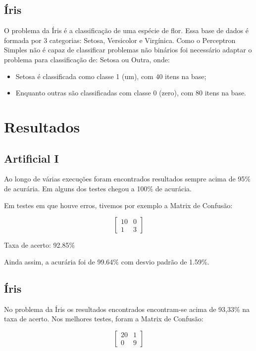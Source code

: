 \subsection{Íris}

O problema da Íris é a classificação de uma espécie de flor. Essa base
de dados é formada por 3 categorias: Setosa, Versicolor e Virgínica.
Como o Perceptron Simples não é capaz de classificar problemas não
binários foi necessário adaptar o problema para classificação de: Setosa
ou Outra, onde:

\begin{itemize}
\tightlist
\item
  Setosa é classificada como classe 1 (um), com 40 itens na base;
\item
  Enquanto outras são classificadas com classe 0 (zero), com 80 itens na
  base.
\end{itemize}

\section{Resultados}

\subsection{Artificial I}

Ao longo de várias execuções foram encontrados resultados sempre acima
de 95\% de acurária. Em alguns dos testes chegou a 100\% de acurácia.

Em testes em que houve erros, tivemos por exemplo a Matrix de Confusão:

\[
\begin{bmatrix}
10 & 0 \\
1 & 3
\end{bmatrix}
\]

Taxa de acerto: 92.85\%

Ainda assim, a acurária foi de 99.64\% com desvio padrão de 1.59\%.

\subsection{Íris}

No problema da Íris os resultados encontrados encontram-se acima de
93,33\% na taxa de acerto. Nos melhores testes, foram a Matrix de
Confusão:

\[
\begin{bmatrix}
20 & 1 \\
0 & 9
\end{bmatrix}
\]

